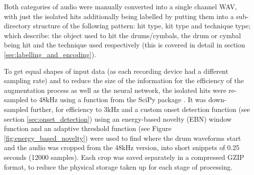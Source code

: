 \documentclass[12pt]{article}
\begin{document}
	Both categories of audio were manually converted into a single channel WAV, with just the isolated hits additionally being labelled by putting them into a sub-directory structure of the following pattern: hit type, kit type and technique type; which describe: the object used to hit the drums/cymbals, the drum or cymbal being hit and the technique used respectively (this is covered in detail in section \ref{sec:labelling_and_encoding}).\medskip 
	
    To get equal shapes of input data (as each recording device had a different sampling rate) and to reduce the size of the information for the efficiency of the augmentation process as well as the neural network, the isolated hits were re-sampled to 48kHz using a function from the SciPy package \parencite{SciPy}. It was down-sampled further, for efficiency to 3kHz and a custom onset detection function (see section \ref{sec:onset_detection}) using an energy-based novelty (EBN) window function and an adaptive threshold function (see Figure \ref{fig:energy_based_novelty}) were used to find where the drum waveforms start and the audio was cropped from the 48kHz version, into short snippets of 0.25 seconds (12000 samples). Each crop was saved separately in a compressed GZIP format, to reduce the physical storage taken up for each stage of processing.\medskip
	
\end{document}
